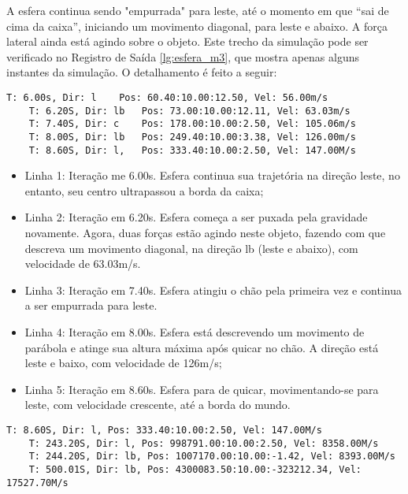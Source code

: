 \documentclass[12pt]{article}
\begin{document}
A esfera continua sendo "empurrada" para leste, até o momento em que “sai de cima da caixa”, iniciando um movimento diagonal, para leste e abaixo. A força lateral ainda está agindo sobre o objeto. Este trecho da simulação pode ser verificado no Registro de Saída \ref{lg:esfera_m3}, que mostra apenas alguns instantes da simulação. O detalhamento é feito a seguir:

\begin{lstlisting}[frame=single,caption=Esfera se movendo diagonalmente\label{lg:esfera_m3}]
	T: 6.00s, Dir: l	Pos: 60.40:10.00:12.50, Vel: 56.00m/s
	T: 6.20S, Dir: lb 	Pos: 73.00:10.00:12.11, Vel: 63.03m/s
	T: 7.40S, Dir: c 	Pos: 178.00:10.00:2.50, Vel: 105.06m/s
	T: 8.00S, Dir: lb 	Pos: 249.40:10.00:3.38, Vel: 126.00m/s
	T: 8.60S, Dir: l, 	Pos: 333.40:10.00:2.50, Vel: 147.00M/s
\end{lstlisting}

\begin{itemize}
	\item Linha 1: Iteração me 6.00s. Esfera continua sua trajetória na direção leste, no entanto, seu centro ultrapassou a borda da caixa;
	
	\item Linha 2: Iteração em 6.20s. Esfera começa a ser puxada pela gravidade novamente. Agora, duas forças estão agindo neste objeto, fazendo com que descreva um movimento diagonal, na direção lb (leste e abaixo), com velocidade de 63.03m/s.
	
	\item Linha 3: Iteração em 7.40s. Esfera atingiu o chão pela primeira vez e continua a ser empurrada para leste.
	
	\item Linha 4: Iteração em 8.00s. Esfera está descrevendo um movimento de parábola e atinge sua altura máxima após quicar no chão. A direção está leste e baixo, com velocidade de 126m/s;
	
	\item Linha 5: Iteração em 8.60s. Esfera para de quicar, movimentando-se para leste, com velocidade crescente, até a borda do mundo.
\end{itemize}

\begin{lstlisting}[frame=single,caption=Esfera sobre o chão e saída do ambiente\label{lg:esferaM4}]
	T: 8.60S, Dir: l, Pos: 333.40:10.00:2.50, Vel: 147.00M/s
	T: 243.20S, Dir: l, Pos: 998791.00:10.00:2.50, Vel: 8358.00M/s
	T: 244.20S, Dir: lb, Pos: 1007170.00:10.00:-1.42, Vel: 8393.00M/s
	T: 500.01S, Dir: lb, Pos: 4300083.50:10.00:-323212.34, Vel: 17527.70M/s
\end{lstlisting}
\end{document}
